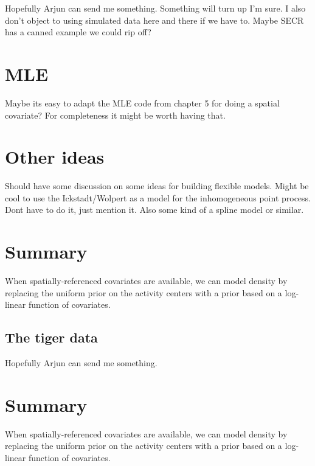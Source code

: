 Hopefully Arjun can send me something. Something will turn up I'm
sure.  I also don't object to using simulated data here and there if
we have to. Maybe SECR has a canned example we could rip off?

\section{MLE}

Maybe its easy to adapt the MLE code from chapter 5 for doing a
spatial covariate? For completeness it might be worth having that.

\section{Other ideas}

Should have some discussion on some ideas for building flexible
models. Might be cool to use the Ickstadt/Wolpert as a model for the
inhomogeneous point process. Dont have to do it, just mention it. Also
some kind of a spline model or similar.


\section{Summary}

When spatially-referenced covariates are available, we can model
density by replacing the uniform prior on the activity centers with a
prior based on a log-linear function of covariates.



\subsection{The tiger data}

Hopefully Arjun can send me something.


\section{Summary}

When spatially-referenced covariates are available, we can model
density by replacing the uniform prior on the activity centers with a
prior based on a log-linear function of covariates.





